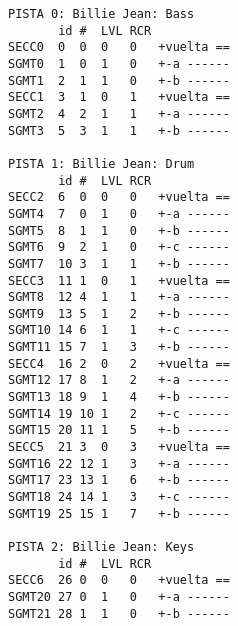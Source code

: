 \begin{verbatim}
PISTA 0: Billie Jean: Bass 
       id #  LVL RCR
SECC0  0  0  0   0   +vuelta ==
SGMT0  1  0  1   0   +-a ------
SGMT1  2  1  1   0   +-b ------
SECC1  3  1  0   1   +vuelta ==
SGMT2  4  2  1   1   +-a ------
SGMT3  5  3  1   1   +-b ------

PISTA 1: Billie Jean: Drum 
       id #  LVL RCR
SECC2  6  0  0   0   +vuelta ==
SGMT4  7  0  1   0   +-a ------
SGMT5  8  1  1   0   +-b ------
SGMT6  9  2  1   0   +-c ------
SGMT7  10 3  1   1   +-b ------
SECC3  11 1  0   1   +vuelta ==
SGMT8  12 4  1   1   +-a ------
SGMT9  13 5  1   2   +-b ------
SGMT10 14 6  1   1   +-c ------
SGMT11 15 7  1   3   +-b ------
SECC4  16 2  0   2   +vuelta ==
SGMT12 17 8  1   2   +-a ------
SGMT13 18 9  1   4   +-b ------
SGMT14 19 10 1   2   +-c ------
SGMT15 20 11 1   5   +-b ------
SECC5  21 3  0   3   +vuelta ==
SGMT16 22 12 1   3   +-a ------
SGMT17 23 13 1   6   +-b ------
SGMT18 24 14 1   3   +-c ------
SGMT19 25 15 1   7   +-b ------

PISTA 2: Billie Jean: Keys 
       id #  LVL RCR
SECC6  26 0  0   0   +vuelta ==
SGMT20 27 0  1   0   +-a ------
SGMT21 28 1  1   0   +-b ------
\end{verbatim}

